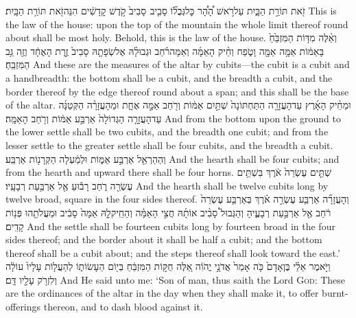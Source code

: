 {זֹ֖את תּוֹרַ֣ת הַבָּ֑יִת עַל\maqqaf רֹ֣אשׁ הָ֠הָ֠ר כׇּל\maqqaf גְּבֻל֞וֹ סָבִ֤יב \pasek  סָבִיב֙ קֹ֣דֶשׁ קׇדָשִׁ֔ים הִנֵּה\maqqaf זֹ֖את תּוֹרַ֥ת הַבָּֽיִת׃}
{This is the law of the house: upon the top of the mountain the whole limit thereof round about shall be most holy. Behold, this is the law of the house.}
{וְאֵ֨לֶּה מִדּ֤וֹת הַמִּזְבֵּ֙חַ֙ בָּאַמּ֔וֹת אַמָּ֥ה אַמָּ֖ה וָטֹ֑פַח וְחֵ֨יק הָאַמָּ֜ה וְאַמָּה\maqqaf רֹ֗חַב וּגְבוּלָ֨הּ אֶל\maqqaf שְׂפָתָ֤הּ סָבִיב֙ זֶ֣רֶת הָאֶחָ֔ד וְזֶ֖ה גַּ֥ב הַמִּזְבֵּֽחַ׃}
{And these are the measures of the altar by cubits—the cubit is a cubit and a handbreadth: the bottom shall be a cubit, and the breadth a cubit, and the border thereof by the edge thereof round about a span; and this shall be the base of the altar.}
{וּמֵחֵ֨יק הָאָ֜רֶץ עַד\maqqaf הָעֲזָרָ֤ה הַתַּחְתּוֹנָה֙ שְׁתַּ֣יִם אַמּ֔וֹת וְרֹ֖חַב אַמָּ֣ה אֶחָ֑ת וּמֵהָעֲזָרָ֨ה הַקְּטַנָּ֜ה עַד\maqqaf הָעֲזָרָ֤ה הַגְּדוֹלָה֙ אַרְבַּ֣ע אַמּ֔וֹת וְרֹ֖חַב הָאַמָּֽה׃}
{And from the bottom upon the ground to the lower settle shall be two cubits, and the breadth one cubit; and from the lesser settle to the greater settle shall be four cubits, and the breadth a cubit.}
{וְהַהַרְאֵ֖ל אַרְבַּ֣ע אַמּ֑וֹת  וּלְמַ֔עְלָה הַקְּרָנ֖וֹת אַרְבַּֽע׃}
{And the hearth shall be four cubits; and from the hearth and upward there shall be four horns.}
{ שְׁתֵּ֤ים עֶשְׂרֵה֙ אֹ֔רֶךְ בִּשְׁתֵּ֥ים עֶשְׂרֵ֖ה רֹ֑חַב רָב֕וּעַ אֶ֖ל אַרְבַּ֥עַת רְבָעָֽיו׃}
{And the hearth shall be twelve cubits long by twelve broad, square in the four sides thereof.}
{וְהָעֲזָרָ֞ה אַרְבַּ֧ע עֶשְׂרֵ֣ה אֹ֗רֶךְ בְּאַרְבַּ֤ע עֶשְׂרֵה֙ רֹ֔חַב אֶ֖ל אַרְבַּ֣עַת רְבָעֶ֑יהָ וְהַגְּבוּל֩ סָבִ֨יב אוֹתָ֜הּ חֲצִ֣י הָאַמָּ֗ה וְהַחֵֽיק\maqqaf לָ֤הּ אַמָּה֙ סָבִ֔יב וּמַעֲלֹתֵ֖הוּ פְּנ֥וֹת קָדִֽים׃}
{And the settle shall be fourteen cubits long by fourteen broad in the four sides thereof; and the border about it shall be half a cubit; and the bottom thereof shall be a cubit about; and the steps thereof shall look toward the east.’}
{וַיֹּ֣אמֶר אֵלַ֗י בֶּן\maqqaf אָדָם֙ כֹּ֤ה אָמַר֙ אֲדֹנָ֣י יֱהֹוִ֔ה אֵ֚לֶּה חֻקּ֣וֹת הַמִּזְבֵּ֔חַ בְּי֖וֹם הֵעָשׂוֹת֑וֹ לְהַעֲל֤וֹת עָלָיו֙ עוֹלָ֔ה וְלִזְרֹ֥ק עָלָ֖יו דָּֽם׃}
{And He said unto me: ‘Son of man, thus saith the Lord \textsc{God}: These are the ordinances of the altar in the day when they shall make it, to offer burnt-offerings thereon, and to dash blood against it.}
